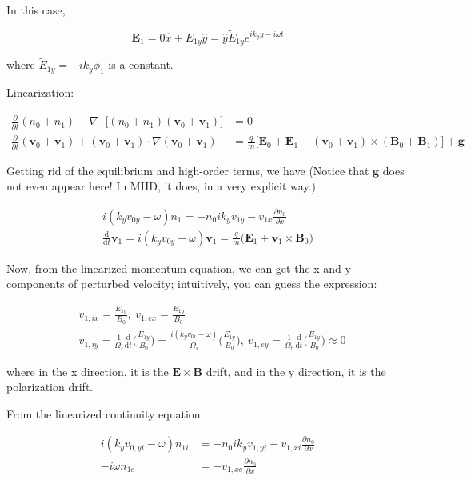 \documentclass[
  notoc %
]{tufte-book}
\begin{document}
In this case,

\[
\mathbf{E}_1=0\hat{x}+E_{1y}\hat{y}=\hat{y}\widetilde{E}_{1y}e^{ik_y y-i\omega t}
\]

where \(\widetilde{E}_{1y}=-i k_y \phi_1\) is a constant.

Linearization:

\[
\begin{aligned}
\frac{\partial}{\partial t}(n_0+n_1) +\nabla\cdot\big[ (n_0+n_1)(\mathbf{v}_0+\mathbf{v}_1) \big]&=0 \\
\frac{\partial}{\partial t}(\mathbf{v}_0+\mathbf{v}_1)+(\mathbf{v}_0+\mathbf{v}_1)\cdot\nabla(\mathbf{v}_0+\mathbf{v}_1)&=\frac{q}{m}\big[ \mathbf{E}_0+\mathbf{E}_1+(\mathbf{v}_0+\mathbf{v}_1)\times(\mathbf{B}_0+\mathbf{B}_1)\big]+\mathbf{g}
\end{aligned}
\]

Getting rid of the equilibrium and high-order terms, we have (Notice
that \(\mathbf{g}\) does not even appear here! In MHD, it does, in a
very explicit way.)

\[
\begin{aligned}
i(k_yv_{0y}-\omega)n_1=-n_0 ik_y v_{1y} - v_{1x}\frac{\partial n_0}{\partial x} \\
\frac{\mathrm{d}}{\mathrm{d}t}\mathbf{v}_1=i(k_yv_{0y}-\omega)\mathbf{v}_1=\frac{q}{m}\big( \mathbf{E}_1+\mathbf{v}_1\times\mathbf{B}_0 \big)
\end{aligned}
\]

Now, from the linearized momentum equation, we can get the x and y
components of perturbed velocity; intuitively, you can guess the
expression:

\[
\begin{aligned}
&v_{1,ix}=\frac{E_{1y}}{B_0},\ v_{1,ex}=\frac{E_{1y}}{B_0}\\
&v_{1,iy}=\frac{1}{\Omega_i}\frac{\mathrm{d}}{\mathrm{d}t}\Big(\frac{E_{1y}}{B_0} \Big)=\frac{i(k_yv_{0i}-\omega)}{\Omega_i}\Big( \frac{E_{1y}}{B_0}\Big),\ v_{1,ey}=\frac{1}{\Omega_e}\frac{\mathrm{d}}{\mathrm{d}t}\Big(\frac{E_{1y}}{B_0} \Big)\approx0
\end{aligned}
\]

where in the x direction, it is the \(\mathbf{E}\times\mathbf{B}\)
drift, and in the y direction, it is the polarization drift.

From the linearized continuity equation

\[
\begin{aligned}
i(k_y v_{0,yi}-\omega)n_{1i} &= -n_0 ik_y v_{1,yi} - v_{1,xi}\frac{\partial n_0}{\partial x} \\
-i\omega n_{1e} &= - v_{1,xe}\frac{\partial n_0}{\partial x}
\end{aligned}
\]
\end{document}
